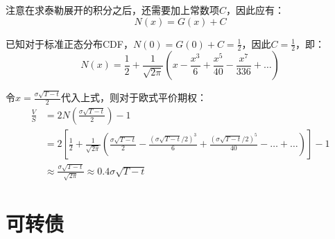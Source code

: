 \documentclass[11pt]{article}
\begin{document}
注意在求泰勒展开的积分之后，还需要加上常数项$C$，因此应有：
\begin{equation*}
    N(x) = G(x) + C
\end{equation*}

已知对于标准正态分布CDF，$N(0) = G(0) + C = \frac{1}{2}$，因此$C=\frac{1}{2}$，即：
\begin{equation*}
   N(x) = \frac{1}{2} + \frac{1}{\sqrt{2\pi}} \left( x -\frac{x^3}{6} + \frac{x^5}{40} - \frac{x^7}{336} + \dots \right) 
\end{equation*}

令$x=\frac{\sigma\sqrt{T-t}}{2}$代入上式，则对于欧式平价期权：
\begin{align*}
    \frac{V}{S} & = 2N\left( \frac{\sigma\sqrt{T-t}}{2} \right) - 1 \\
    & = 2\left[\frac{1}{2} + \frac{1}{\sqrt{2\pi}} \left(\frac{\sigma\sqrt{T-t}}{2} - \frac{(\sigma\sqrt{T-t}/2)^3}{6} + \frac{(\sigma\sqrt{T-t}/2)^5}{40} - \dots + \dots\right) \right] - 1\\
    &\approx \frac{\sigma\sqrt{T-t}}{\sqrt{2\pi}} \approx 0.4\sigma\sqrt{T-t}
\end{align*}

\section{可转债}


\appendix
\end{document}
